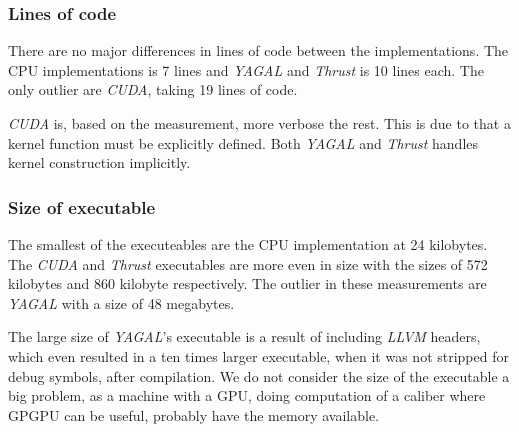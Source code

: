 \subsubsection[*]{Lines of code}
There are no major differences in lines of code between the implementations. The CPU implementations is 7 lines and \textit{YAGAL} and \textit{Thrust} is 10 lines each. The only outlier are \textit{CUDA}, taking 19 lines of code. 

\textit{CUDA} is, based on the measurement, more verbose the rest. This is due to that a kernel function must be explicitly defined. Both \textit{YAGAL} and \textit{Thrust} handles kernel construction implicitly.

\subsubsection[*]{Size of executable}
The smallest of the executeables are the CPU implementation at 24 kilobytes. The \textit{CUDA} and \textit{Thrust} executables are more even in size with the sizes of 572 kilobytes and 860 kilobyte respectively. The outlier in these measurements are \textit{YAGAL} with a size of 48 megabytes.

The large size of \textit{YAGAL}'s executable is a result of including \textit{LLVM} headers, which even resulted in a ten times larger executable, when it was not stripped for debug symbols, after compilation. We do not consider the size of the executable a big problem, as a machine with a GPU, doing computation of a caliber where GPGPU can be useful, probably have the memory available. 

